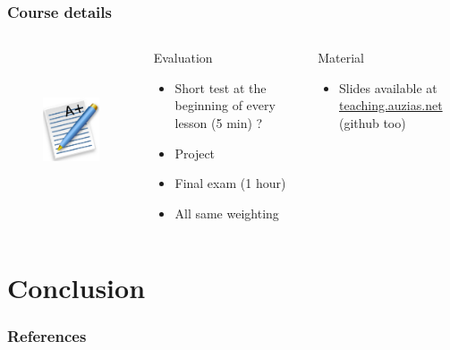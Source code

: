 \documentclass{beamer}
\begin{document}
  \begin{frame}
    \frametitle{Course details}
    \begin{columns}
        \begin{figure}[t]
          \centering
          \includegraphics[height=4cm]{./imgs/grade.pdf}
          \label{fig:marks}
        \end{figure}
        \begin{block}{Evaluation}
          \begin{itemize}
            \item Short test at the beginning of every lesson (5 min) ?
            \item Project
            \item Final exam (1 hour)
            \item All same weighting
          \end{itemize}
        \end{block}
        \begin{block}{Material}
          \begin{itemize}
            \item Slides available at \color{blue}\href{http://teaching.auzias.net}{teaching.auzias.net} \color{black} (github too)
          \end{itemize}
        \end{block}
    \end{columns}
  \end{frame}







\section*{Conclusion}
  \begin{frame}
    \frametitle{References}
    
  \end{frame}
\end{document}

